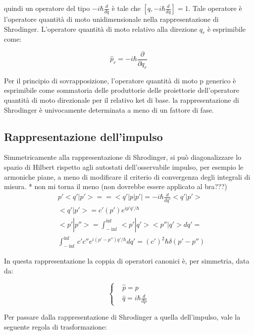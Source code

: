 \documentclass{article}
\begin{document}
quindi un operatore del tipo $-i\hbar\frac{d}{dq}$ è tale che $[q,-i\hbar\frac{d}{dq}]=1$.
Tale operatore è l'operatore quantità di moto unidimensionale nella rappresentazione di Shrodinger.
L'operatore quantità di moto relativo alla direzione $q_r$ è esprimibile come:

\begin{equation}
    \hat{p}_r = -i\hbar \frac{\partial}{\partial q_r}
\end{equation}

Per il principio di sovrapposizione, l'operatore quantità di moto p generico è esprimibile come sommatoria
delle produttorie delle proiettorie dell'operatore quantità di moto direzionale per il relativo ket di base.
la rappresentazione di Shrodinger è univocamente determinata a meno di un fattore di fase.


\subsection{Rappresentazione dell'impulso}
Simmetricamente alla rappresentazione di Shrodinger, si può diagonalizzare lo spazio di Hilbert rispetto agli autostati dell'osservabile impulso, per
esempio le armoniche piane, a meno di modificare il criterio di convergenza degli integrali di misura.
* non mi torna il meno (non dovrebbe essere applicato al bra???)
\begin{equation}
    \begin{aligned}
        & p'<q'|p'>==<q'|p|p'|=-i\hbar\frac{d}{dq'}<q'|p'> \\
        & <q'|p'>=c'(p')e^{ip'q'/\hbar} \\
        & <p' | p''> = \int_{-\inf}^{\inf} <p' |q'><p''|q'>dq'= \\
        & \int_{-\inf}^{\inf} c'c'' e^{i(p'-p'')q'/\hbar}dq'= (c')^2 \hbar \delta(p'-p'')
    \end{aligned}
\end{equation}

In questa rappresentazione la coppia di operatori canonici è, per simmetria, data da:

\begin{equation}
    \left\{
    \begin{aligned}
     & \hat{p}=p \\
     & \hat{q}=i\hbar \frac{d}{dp}
    \end{aligned}
    \right.
\end{equation}

Per passare dalla rappresentazione di Shrodinger a quella dell'impulso, vale la seguente regola di trasformazione:
\end{document}
